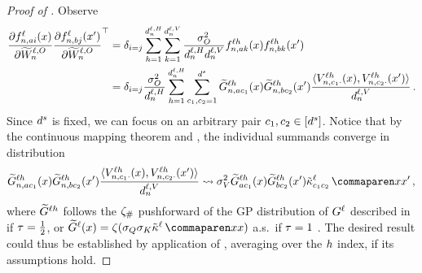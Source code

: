 \begin{proof}[Proof of ]
Observe
\begin{align*}
    \frac{
        \partial {f}^{\ell}_{n, a i}{(x)}
    }{
        \partial \widetilde{W}_n^{\ell, O}
    }
    \frac{
        \partial {f}^{\ell}_{n, b j}{(x')}
    }{
        \partial \widetilde{W}_n^{\ell, O}
    }^\top
    &=
    \delta_{i = j}
    \sum_{h = 1}^{d_{n}^{\ell, H}}
    \sum_{k = 1}^{d_{n}^{\ell, V}}
        \frac{\sigma_{O}^2}{d_{n}^{\ell, H} d_{n}^{\ell, V}}
        {f}^{\ell h}_{n, a k}{(x)}
        {f}^{\ell h}_{n, b k}{(x')}
    \\
    &=
    \delta_{i = j}
    \frac{\sigma_{O}^2}{d_{n}^{\ell, H}}
    \sum_{h = 1}^{d_{n}^{\ell, H}}
    \sum_{c_1, c_2 = 1}^{d^s}
        \widetilde{G}_{n, a c_1}^{\ell h} (x)
        \widetilde{G}_{n, b c_2}^{\ell h} (x')
        \frac{
            \langle
                V_{n, c_1 \cdot}^{\ell h}(x) 
                ,
                V_{n, c_2 \cdot}^{\ell h}(x')
            \rangle
        }{
            d_{n}^{\ell, V}
        }
    \, .
\end{align*}
Since $d^s$ is fixed, we can focus on an arbitrary pair $c_1, c_2 \in [d^s]$.
Notice that by the continuous mapping theorem and , the individual summands converge in distribution
$$
\tildeLogitN{\sequenceVariable, \fIndexA c_1}{\depthSymbol\headIndex}{\inputSymbol}
\tildeLogitN{\sequenceVariable, \fIndexB c_2}{\depthSymbol\headIndex}{\inputSymbol'}
\frac{
    \langle
        \val{\sequenceVariable, c_1 \cdot}{\depthSymbol\headIndex}(\inputSymbol) 
        ,
        \val{\sequenceVariable, c_2 \cdot}{\depthSymbol\headIndex}(\inputSymbol')
    \rangle
}{
    \valueDimension
}
\convergeDist
\valueVar
\tildeLogitN{\fIndexA c_1}{\depthSymbol\headIndex}{\inputSymbol}
\tildeLogitN{\fIndexB c_2}{\depthSymbol\headIndex}{\inputSymbol'}
\kerntildef{c_1 c_2}{\depthSymbol}{\inputSymbol}{\inputSymbol'}
\, ,
$$
where $\widetilde{G}_{}^{\ell
h}$ follows the $\zeta_\#$ pushforward of the GP distribution of $G^{\ell}$ described in  if $\tau = \frac{1}{2}$, or $\tildeLogitN{}{\depthSymbol}{\inputSymbol} = \softmax (\queryStd \keyStd \kerntildef{}{\depthSymbol}{\inputSymbol}{\inputSymbol})$ a.s.\ if $\tau = 1$ \citep[appendix A]{yang2019v2}.
The desired result could thus be established by application of , averaging over the $h$ index, if its assumptions hold.


\end{proof}
